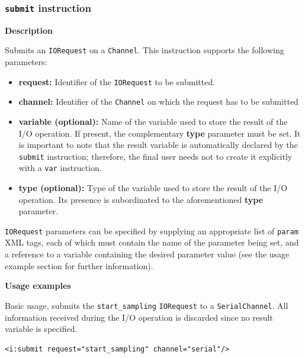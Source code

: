 \subsubsection{\texttt{submit} instruction}

\textbf{Description}

Submits an \texttt{IORequest} on a \texttt{Channel}. This instruction supports
the following parameters:

\begin{itemize}

    \item \textbf{request:} Identifier of the \texttt{IORequest} to be
        submitted.

    \item \textbf{channel:} Identifier of the \texttt{Channel} on which the
        request has to be submitted

    \item \textbf{variable (optional):} Name of the variable used to store the
        result of the I/O operation. If present, the complementary
        \textbf{type} parameter must be set. It is important to note that the
        result variable is automatically declared by the \texttt{submit}
        instruction; therefore, the final user needs not to create it
        explicitly with a \texttt{var} instruction.

    \item \textbf{type (optional):} Type of the variable used to store the
        result of the I/O operation. Its presence is subordinated to the
        aforementioned \textbf{type} parameter.

\end{itemize}

\texttt{IORequest} parameters can be specified by supplying an appropriate list
of \texttt{param} XML tags, each of which must contain the name of the
parameter being set, and a reference to a variable containing the desired
parameter value (see the usage example section for further information).

\textbf{Usage examples}

Basic usage, submits the \texttt{start\_sampling} \texttt{IORequest} to a
\texttt{SerialChannel}. All information received during the I/O operation is
discarded since no result variable is specified.

\lstset{language=XML}
\begin{lstlisting}
<i:submit request="start_sampling" channel="serial"/>
\end{lstlisting}

